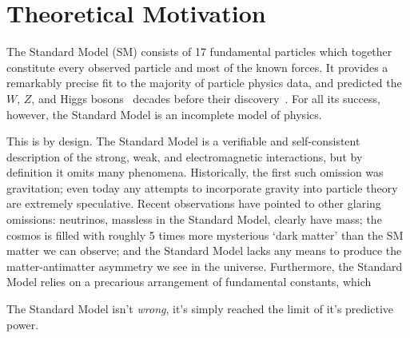 \chapter{Theoretical Motivation}

The Standard Model (SM) consists of 17 fundamental particles which together constitute every observed particle and most of the known forces.
It provides a remarkably precise fit to the majority of particle physics data, and predicted the $W$, $Z$, and Higgs bosons~\cite{wzmass1,higgs1,higgs2} decades before their discovery~\cite{ua1w,ua2w,ua1z,ua2z,atlashiggs,cmshiggs}.
For all its success, however, the Standard Model is an incomplete model of physics.

This is by design. The Standard Model is a verifiable and self-consistent description of the strong, weak, and electromagnetic interactions, but by definition it omits many phenomena.
Historically, the first such omission was gravitation; even today any attempts to incorporate gravity into particle theory are extremely speculative.
Recent observations have pointed to other glaring omissions:
neutrinos, massless in the Standard Model, clearly have mass;
the cosmos is filled with roughly 5 times more mysterious `dark matter' than the SM matter we can observe;
and the Standard Model lacks any means to produce the matter-antimatter asymmetry we see in the universe.
Furthermore, the Standard Model relies on a precarious arrangement of fundamental constants, which 

The Standard Model isn't \emph{wrong}, it's simply reached the limit of it's predictive power.




